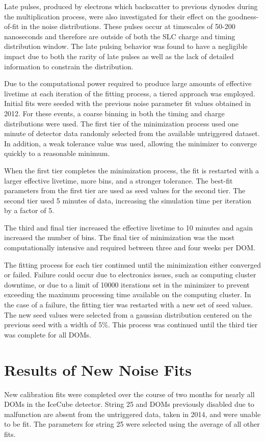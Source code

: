 Late pulses, produced by electrons which backscatter to previous dynodes during the multiplication process, were also investigated for their effect on the goodness-of-fit in the noise distributions.
These pulses occur at timescales of 50-200 nanoseconds and therefore are outside of both the SLC charge and timing distribution window.
The late pulsing behavior was found to have a negligible impact due to both the rarity of late pulses as well as the lack of detailed information to constrain the distribution.

Due to the computational power required to produce large amounts of effective livetime at each iteration of the fitting process, a tiered approach was employed.
Initial fits were seeded with the previous noise parameter fit values obtained in 2012.
For these events, a coarse binning in both the timing and charge distributions were used.
The first tier of the minimization process used one minute of detector data randomly selected from the available untriggered dataset.
In addition, a weak tolerance value was used, allowing the minimizer to converge quickly to a reasonable minimum.

When the first tier completes the minimization process, the fit is restarted with a larger effective livetime, more bins, and a stronger tolerance.
The best-fit parameters from the first tier are used as seed values for the second tier.
The second tier used 5 minutes of data, increasing the simulation time per iteration by a factor of 5.

The third and final tier increased the effective livetime to 10 minutes and again increased the number of bins.
The final tier of minimization was the most computationally intensive and required between three and four weeks per DOM. 

The fitting process for each tier continued until the minimization either converged or failed.
Failure could occur due to electronics issues, such as computing cluster downtime, or due to a limit of 10000 iterations set in the minimizer to prevent exceeding the maximum processing time available on the computing cluster. 
In the case of a failure, the fitting tier was restarted with a new set of seed values.
The new seed values were selected from a gaussian distribution centered on the previous seed with a width of 5\%.
This process was continued until the third tier was complete for all DOMs.

\section{Results of New Noise Fits}
\label{sec:vuvuzela_newfits}
New calibration fits were completed over the course of two months for nearly all DOMs in the IceCube detector.
String 25 and DOMs previously disabled due to malfunction are absent from the untriggered data, taken in 2014, and were unable to be fit.
The parameters for string 25 were selected using the average of all other fits.


